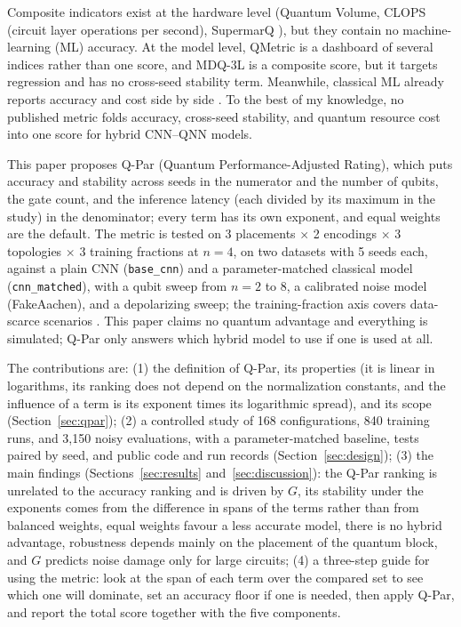 \documentclass{ieeeaccess}
\begin{document}
Composite indicators exist at the hardware level (Quantum Volume, CLOPS (circuit layer operations per second), SupermarQ \cite{cross2019qv,wack2021clops,tomesh2022supermarq}), but they contain no machine-learning (ML) accuracy. At the model level, QMetric \cite{illesova2025qmetric} is a dashboard of several indices rather than one score, and MDQ-3L \cite{mogaraju2026mdq3l} is a composite score, but it targets regression and has no cross-seed stability term. Meanwhile, classical ML already reports accuracy and cost side by side \cite{reddi2020mlperf,schwartz2020greenai}. To the best of my knowledge, no published metric folds accuracy, cross-seed stability, and quantum resource cost into one score for hybrid CNN--QNN models.

This paper proposes Q-Par (Quantum Performance-Adjusted Rating), which puts accuracy and stability across seeds in the numerator and the number of qubits, the gate count, and the inference latency (each divided by its maximum in the study) in the denominator; every term has its own exponent, and equal weights are the default. The metric is tested on 3 placements $\times$ 2 encodings $\times$ 3 topologies $\times$ 3 training fractions at $n = 4$, on two datasets with 5 seeds each, against a plain CNN (\texttt{base\_cnn}) and a parameter-matched classical model (\texttt{cnn\_matched}), with a qubit sweep from $n = 2$ to 8, a calibrated noise model (FakeAachen), and a depolarizing sweep; the training-fraction axis covers data-scarce scenarios \cite{he2025qgan}. This paper claims no quantum advantage and everything is simulated; Q-Par only answers which hybrid model to use if one is used at all.

The contributions are: (1) the definition of Q-Par, its properties (it is linear in logarithms, its ranking does not depend on the normalization constants, and the influence of a term is its exponent times its logarithmic spread), and its scope (Section~\ref{sec:qpar}); (2) a controlled study of 168 configurations, 840 training runs, and 3,150 noisy evaluations, with a parameter-matched baseline, tests paired by seed, and public code and run records (Section~\ref{sec:design}); (3) the main findings (Sections~\ref{sec:results} and~\ref{sec:discussion}): the Q-Par ranking is unrelated to the accuracy ranking and is driven by $G$, its stability under the exponents comes from the difference in spans of the terms rather than from balanced weights, equal weights favour a less accurate model, there is no hybrid advantage, robustness depends mainly on the placement of the quantum block, and $G$ predicts noise damage only for large circuits; (4) a three-step guide for using the metric: look at the span of each term over the compared set to see which one will dominate, set an accuracy floor if one is needed, then apply Q-Par, and report the total score together with the five components.
\end{document}
